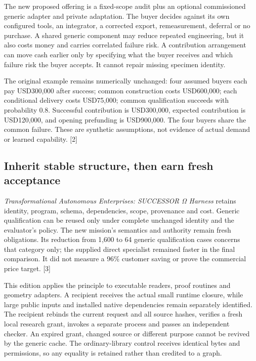 \documentclass[
  11pt,
]{article}
\let\OriginalSubsection\subsection
\renewcommand{\subsection}{\needspace{6\baselineskip}\OriginalSubsection}
\begin{document}
The new proposed offering is a fixed-scope audit plus an optional
commissioned generic adapter and private adaptation. The buyer decides
against its own configured tools, an integrator, a corrected export,
remeasurement, deferral or no purchase. A shared generic component may
reduce repeated engineering, but it also costs money and carries
correlated failure risk. A contribution arrangement can move cash
earlier only by specifying what the buyer receives and which failure
risk the buyer accepts. It cannot repair missing specimen identity.

The original example remains numerically unchanged: four assumed buyers
each pay USD300,000 after success; common construction costs USD600,000;
each conditional delivery costs USD75,000; common qualification succeeds
with probability 0.8. Successful contribution is USD300,000, expected
contribution is USD120,000, and opening prefunding is USD900,000. The
four buyers share the common failure. These are synthetic assumptions,
not evidence of actual demand or learned capability. {[}2{]}

\hypertarget{inherit-stable-structure-then-earn-fresh-acceptance}{%
\subsection{Inherit stable structure, then earn fresh
acceptance}\label{inherit-stable-structure-then-earn-fresh-acceptance}}

\emph{Transformational Autonomous Enterprises: SUCCESSOR Ω Harness}
retains identity, program, schema, dependencies, scope, provenance and
cost. Generic qualification can be reused only under complete unchanged
identity and the evaluator's policy. The new mission's semantics and
authority remain fresh obligations. Its reduction from 1,600 to 64
generic qualification cases concerns that category only; the supplied
direct specialist remained faster in the final comparison. It did not
measure a 96\% customer saving or prove the commercial price target.
{[}3{]}

This edition applies the principle to executable readers, proof routines
and geometry adapters. A recipient receives the actual small runtime
closure, while large public inputs and installed native dependencies
remain separately identified. The recipient rebinds the current request
and all source hashes, verifies a fresh local research grant, invokes a
separate process and passes an independent checker. An expired grant,
changed source or different purpose cannot be revived by the generic
cache. The ordinary-library control receives identical bytes and
permissions, so any equality is retained rather than credited to a
graph.
\end{document}
